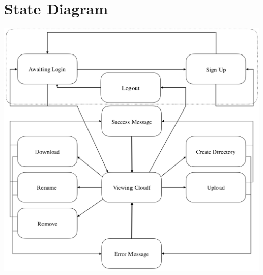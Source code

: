 \documentclass[12pt]{report}
\begin{document}
%
%
\section*{State Diagram}
\begin{center}
    \includegraphics[width=1\textwidth]{images/state_diagram.png}
\end{center}

\pagebreak
\end{document}

